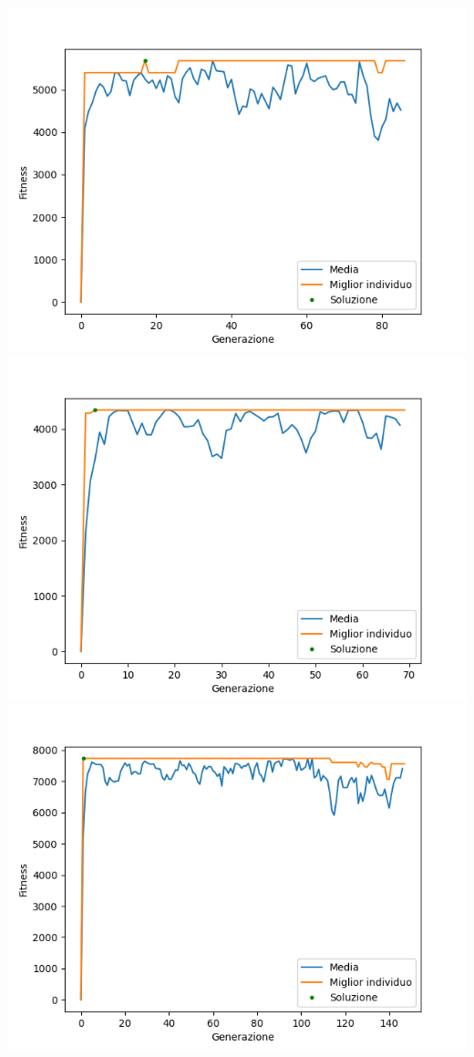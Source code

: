 \documentclass{CSUniSchoolLabReport}
\begin{document}
\begin{center}
	\includegraphics[scale=0.25]{results/12}
	\includegraphics[scale=0.25]{results/13}
	\includegraphics[scale=0.25]{results/14}

\end{center}
\end{document}

